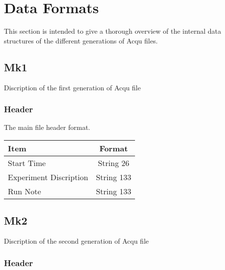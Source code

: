\section{Data Formats}
This section is intended to give a thorough overview of the internal data structures of the different generations of Acqu files.
\subsection{Mk1}
Discription of the first generation of Acqu file
\subsubsection{Header}
The main file header format.

\begin{tabular}{ l|c }
  Item & Format \\
  \hline
  Start Time & String 26 \\
  Experiment Discription & String 133 \\
  Run Note & String 133 \\
\end{tabular}


\subsection{Mk2}
Discription of the second generation of Acqu file
\subsubsection{Header}
